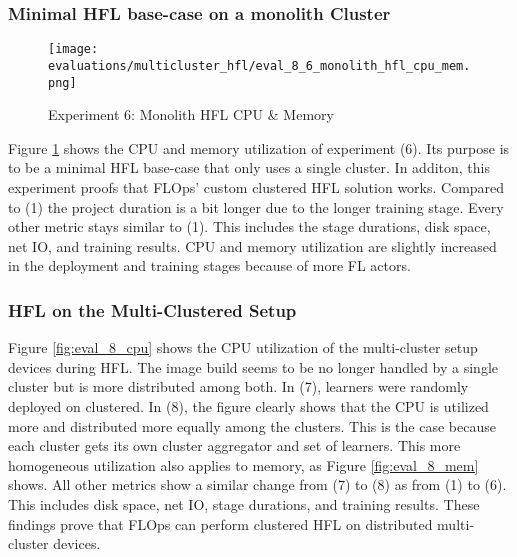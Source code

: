 \pagebreak

\subsubsection{Minimal HFL base-case on a monolith Cluster}

\begin{figure}[H]
    \begin{adjustwidth}{-0.2\paperwidth}{-0.2\paperwidth}
        \centering
        \texttt{[image: evaluations/multicluster\_hfl/eval\_8\_6\_monolith\_hfl\_cpu\_mem.png]}
        \caption{Experiment 6: Monolith HFL CPU \& Memory}
        \label{fig:eval_6_cpu_mem}
    \end{adjustwidth}
\end{figure}

Figure \ref{fig:eval_6_cpu_mem} shows the CPU and memory utilization of experiment (6).
Its purpose is to be a minimal HFL base-case that only uses a single cluster.
In additon, this experiment proofs that FLOps' custom clustered HFL solution works.
Compared to (1) the project duration is a bit longer due to the longer training stage.
Every other metric stays similar to (1).
This includes the stage durations, disk space, net IO, and training results.
CPU and memory utilization are slightly increased in the deployment and training stages because of more FL actors.


\subsubsection{HFL on the Multi-Clustered Setup}

Figure \ref{fig:eval_8_cpu} shows the CPU utilization of the multi-cluster setup devices during HFL.
The image build seems to be no longer handled by a single cluster but is more distributed among both.
In (7), learners were randomly deployed on clustered.
In (8), the figure clearly shows that the CPU is utilized more and distributed more equally among the clusters.
This is the case because each cluster gets its own cluster aggregator and set of learners.
This more homogeneous utilization also applies to memory, as Figure \ref{fig:eval_8_mem} shows.
All other metrics show a similar change from (7) to (8) as from (1) to (6).
This includes disk space, net IO, stage durations, and training results.
These findings prove that FLOps can perform clustered HFL on distributed multi-cluster devices.


